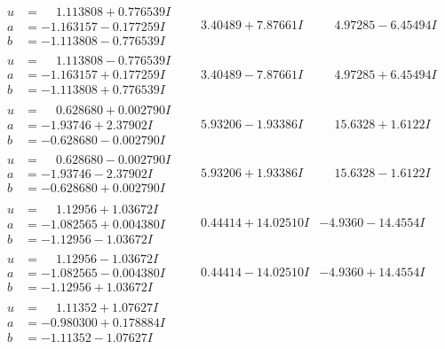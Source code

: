 \documentclass[1p]{elsarticle_modified}
\theoremstyle{definition}
\begin{document}
$$\begin{array}{c|c|c}
\begin{aligned}
u &= \phantom{-}1.113808 + 0.776539 I \\
a &= -1.163157 - 0.177259 I \\
b &= -1.113808 - 0.776539 I\end{aligned}
 & \phantom{-}3.40489 + 7.87661 I & \phantom{-}4.97285 - 6.45494 I \\ \hline\begin{aligned}
u &= \phantom{-}1.113808 - 0.776539 I \\
a &= -1.163157 + 0.177259 I \\
b &= -1.113808 + 0.776539 I\end{aligned}
 & \phantom{-}3.40489 - 7.87661 I & \phantom{-}4.97285 + 6.45494 I \\ \hline\begin{aligned}
u &= \phantom{-}0.628680 + 0.002790 I \\
a &= -1.93746 + 2.37902 I \\
b &= -0.628680 - 0.002790 I\end{aligned}
 & \phantom{-}5.93206 - 1.93386 I & \phantom{-}15.6328 + 1.6122 I \\ \hline\begin{aligned}
u &= \phantom{-}0.628680 - 0.002790 I \\
a &= -1.93746 - 2.37902 I \\
b &= -0.628680 + 0.002790 I\end{aligned}
 & \phantom{-}5.93206 + 1.93386 I & \phantom{-}15.6328 - 1.6122 I \\ \hline\begin{aligned}
u &= \phantom{-}1.12956 + 1.03672 I \\
a &= -1.082565 + 0.004380 I \\
b &= -1.12956 - 1.03672 I\end{aligned}
 & \phantom{-}0.44414 + 14.02510 I & -4.9360 - 14.4554 I \\ \hline\begin{aligned}
u &= \phantom{-}1.12956 - 1.03672 I \\
a &= -1.082565 - 0.004380 I \\
b &= -1.12956 + 1.03672 I\end{aligned}
 & \phantom{-}0.44414 - 14.02510 I & -4.9360 + 14.4554 I \\ \hline\begin{aligned}
u &= \phantom{-}1.11352 + 1.07627 I \\
a &= -0.980300 + 0.178884 I \\
b &= -1.11352 - 1.07627 I\end{aligned}

\end{array}$$
\end{document}
